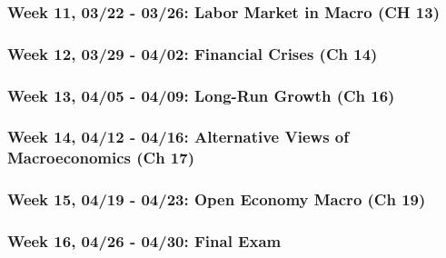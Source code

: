 \documentclass[11pt,]{article}
\begin{document}
\hypertarget{week-11-0322---0326-labor-market-in-macro-ch-13}{%
\subsubsection*{Week 11, 03/22 - 03/26: Labor Market in Macro (CH 13)}\label{week-11-0322---0326-labor-market-in-macro-ch-13}}

\hypertarget{week-12-0329---0402-financial-crises-ch-14}{%
\subsubsection*{Week 12, 03/29 - 04/02: Financial Crises (Ch 14)}\label{week-12-0329---0402-financial-crises-ch-14}}

\hypertarget{week-13-0405---0409-long-run-growth-ch-16}{%
\subsubsection*{Week 13, 04/05 - 04/09: Long-Run Growth (Ch 16)}\label{week-13-0405---0409-long-run-growth-ch-16}}

\hypertarget{week-14-0412---0416-alternative-views-of-macroeconomics-ch-17}{%
\subsubsection*{Week 14, 04/12 - 04/16: Alternative Views of Macroeconomics (Ch 17)}\label{week-14-0412---0416-alternative-views-of-macroeconomics-ch-17}}

\hypertarget{week-15-0419---0423-open-economy-macro-ch-19}{%
\subsubsection*{Week 15, 04/19 - 04/23: Open Economy Macro (Ch 19)}\label{week-15-0419---0423-open-economy-macro-ch-19}}

\hypertarget{week-16-0426---0430-final-exam}{%
\subsubsection*{\texorpdfstring{Week 16, 04/26 - 04/30: \textbf{Final Exam}}{Week 16, 04/26 - 04/30: Final Exam}}\label{week-16-0426---0430-final-exam}}
\end{document}

